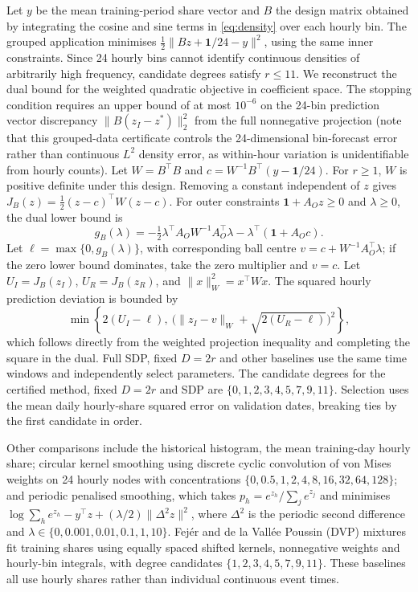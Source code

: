 Let \(y\) be the mean training-period share vector and \(B\) the design matrix obtained by integrating the cosine and sine terms in \eqref{eq:density} over each hourly bin. The grouped application minimises \(\tfrac12\|Bz+\mathbf1/24-y\|^2\), using the same inner constraints. Since 24 hourly bins cannot identify continuous densities of arbitrarily high frequency, candidate degrees satisfy \(r\le11\). We reconstruct the dual bound for the weighted quadratic objective in coefficient space. The stopping condition requires an upper bound of at most \(10^{-6}\) on the 24-bin prediction vector discrepancy \(\|B(z_I-z^*)\|_2^2\) from the full nonnegative projection (note that this grouped-data certificate controls the 24-dimensional bin-forecast error rather than continuous \(L^2\) density error, as within-hour variation is unidentifiable from hourly counts). Let \(W=B^\top B\) and \(c=W^{-1}B^\top(y-\mathbf1/24)\). For \(r\ge1\), \(W\) is positive definite under this design. Removing a constant independent of \(z\) gives \(J_B(z)=\tfrac12(z-c)^\top W(z-c)\). For outer constraints \(\mathbf1+A_Oz\ge0\) and \(\lambda\ge0\), the dual lower bound is
\[g_B(\lambda)=-\tfrac12\lambda^\top A_OW^{-1}A_O^\top\lambda-\lambda^\top(\mathbf1+A_Oc).\]
Let \(\ell=\max\{0,g_B(\lambda)\}\), with corresponding ball centre \(v=c+W^{-1}A_O^\top\lambda\); if the zero lower bound dominates, take the zero multiplier and \(v=c\). Let \(U_I=J_B(z_I)\), \(U_R=J_B(z_R)\), and \(\|x\|_W^2=x^\top Wx\). The squared hourly prediction deviation is bounded by
\[\min\!\left\{2(U_I-\ell),\ \bigl(\|z_I-v\|_W+\sqrt{2(U_R-\ell)}\bigr)^2\right\},\]
which follows directly from the weighted projection inequality and completing the square in the dual. Full SDP, fixed \(D=2r\) and other baselines use the same time windows and independently select parameters. The candidate degrees for the certified method, fixed \(D=2r\) and SDP are \(\{0,1,2,3,4,5,7,9,11\}\). Selection uses the mean daily hourly-share squared error on validation dates, breaking ties by the first candidate in order.

Other comparisons include the historical histogram, the mean training-day hourly share; circular kernel smoothing using discrete cyclic convolution of von Mises weights on 24 hourly nodes with concentrations \(\{0,0.5,1,2,4,8,16,32,64,128\}\); and periodic penalised smoothing, which takes \(p_h=e^{z_h}/\sum_j e^{z_j}\) and minimises \(\log\sum_h e^{z_h}-y^\top z+(\lambda/2)\|\Delta^2z\|^2\), where \(\Delta^2\) is the periodic second difference and \(\lambda\in\{0,0.001,0.01,0.1,1,10\}\). Fejér and de la Vallée Poussin (DVP) mixtures fit training shares using equally spaced shifted kernels, nonnegative weights and hourly-bin integrals, with degree candidates \(\{1,2,3,4,5,7,9,11\}\). These baselines all use hourly shares rather than individual continuous event times.

